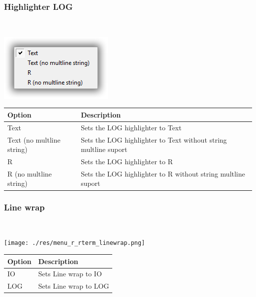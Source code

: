 \hypertarget{menu_view_r_rterm_highlighter_Log}{}
\subsubsection{Highlighter LOG}\\

\includegraphics[scale=0.50]{./res/menu_r_rterm_highlighter_log.png}\\

\begin{scriptsize}\begin{tabularx}{\textwidth}{>{\hsize=0.3\hsize}X>{\hsize=0.7\hsize}X}\\
    \hline
    \textbf{Option} & \textbf{Description} \\
    \hline
    Text & Sets the LOG highlighter to Text \\
    Text (no multline string) & Sets the LOG highlighter to Text without string multline suport \\
    R & Sets the LOG highlighter to R \\
    R (no multline string) & Sets the LOG highlighter to R without string multline suport \\
    \hline
  \end{tabularx}\end{scriptsize}


\hypertarget{menu_view_r_rterm_linewrap}{}
\subsubsection{Line wrap}\\

\texttt{[image: ./res/menu\_r\_rterm\_linewrap.png]}\\

\begin{scriptsize}\begin{tabularx}{\textwidth}{>{\hsize=0.3\hsize}X>{\hsize=0.7\hsize}X}\\
    \hline
    \textbf{Option} & \textbf{Description} \\
    \hline
    IO & Sets Line wrap to IO \\
    LOG & Sets Line wrap to LOG \\
    \hline
  \end{tabularx}\end{scriptsize}


